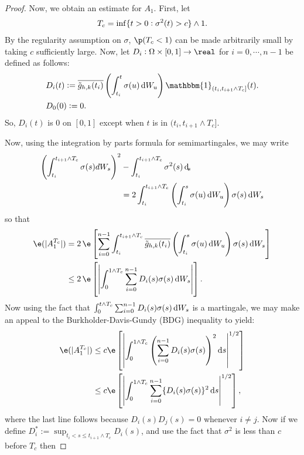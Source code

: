 \begin{proof}
Now, we obtain an estimate for $A_{1}$. First, let 
\begin{align}
  T_c = \inf \{ t >0 : \sigma^2(t) > c \} \wedge 1\notag.
  \label{}
\end{align}
By the regularity assumption on $\sigma$, $\p(T_c < 1)$ can be made arbitrarily small by taking $c$ sufficiently large.  
Now, let $D_i: \Omega\times[0,1] \to \real$ for $i = 0, \cdots, n-1$ be defined as follows:  
\begin{align}
&D_{i}(t) := \btghki\left(\int_{t_i}^{t} \sigma(u)\D W_u\right)\mathbbm{1}_{(t_i, t_{i+1} \wedge T_c]}(t).
  \label{eq:Di}\\
&D_0(0) := 0.
\end{align}
So, $D_i(t)$ is 0 on $[0,1]$ except when $t$ is in $(t_i, t_{i+1} \wedge T_c]$.


Now, using the integration by parts formula for semimartingales, we may write
\begin{align}
  \left(\int^{t_{i+1} \wedge T_c}_{t_i} \sigma(s) d W_s\right)^2  & - \int^{t_{i+ 1}\wedge T_c}_{t_i} \sigma^2(s) \D_s \notag \\ &= 2\int_{t_i}^{t_{i+1}\wedge T_c }\left(\int_{t_i}^{s} \sigma(u)\D W_u\right)\sigma(s) \D W_s\notag
  \label{}
\end{align}
so that 
\begin{align}
  \e(\vert A_1^{T_c} \vert )  &= 2\,\e\left[\sumin\int_{t_i}^{t_{i+1} \wedge T_c}\btghki\left(\int_{t_i}^{s} \sigma(u)\D W_u\right)\sigma(s) \D W_s\right ]\notag \\
  & \le 2\,\e\left[\left\vert\int_0^{1 \wedge T_c}\sumin D_i(s) \sigma(s) \D W_s\right\vert \right].\notag 
  \label{}
\end{align}
Now using the fact that $\int_0^{t \wedge T_c}\sumin D_i(s) \sigma(s) \D W_s$ is a  martingale, we may make an appeal to the Burkholder-Davis-Gundy (BDG) inequality \citep[Theorem 10.36][]{He1992} to yield:
\begin{align}
  \e(\vert A_1^{T_c} \vert) & \le c\e\left[\left\vert\int_0^{1\wedge T_c}\left(\sumin D_i(s) \sigma(s)\right)^2 \D s\right\vert^{1/2} \right]\notag \\
  & \le c\e\left[\left\vert\int_0^{1 \wedge T_c}\sumin \{D_i(s) \sigma(s)\}^2 \D s\right\vert^{1/2} \right]\notag,
  \notag
  \label{}
\end{align}
where the last line follows because $D_i (s) D_j(s) = 0$ whenever $i \not= j$. Now if  we define $D^*_i := \sup_{t_i <s \le t_{i+1} \wedge T_c} D_i(s)$, and use the fact that $\sigma^2$ is less than  $c$ before $T_c$ then

\end{proof}
